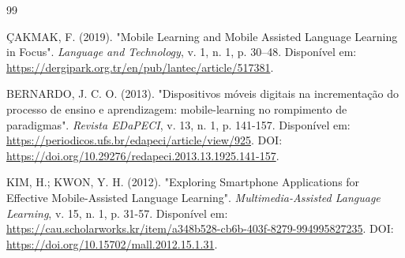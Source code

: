 \documentclass[portuguese]{sbcreviews-2025}%
\begin{document}
\begin{thebibliography}{99}

 ÇAKMAK, F. (2019). "Mobile Learning and Mobile Assisted Language Learning in Focus". \textit{Language and Technology}, v. 1, n. 1, p. 30–48. Disponível em: \url{https://dergipark.org.tr/en/pub/lantec/article/517381}.

 BERNARDO, J. C. O. (2013). "Dispositivos móveis digitais na incrementação do processo de ensino e aprendizagem: mobile-learning no rompimento de paradigmas". \textit{Revista EDaPECI}, v. 13, n. 1, p. 141-157. Disponível em: \url{https://periodicos.ufs.br/edapeci/article/view/925}. DOI: \url{https://doi.org/10.29276/redapeci.2013.13.1925.141-157}.

 KIM, H.; KWON, Y. H. (2012). "Exploring Smartphone Applications for Effective Mobile-Assisted Language Learning". \textit{Multimedia-Assisted Language Learning}, v. 15, n. 1, p. 31-57. Disponível em: \url{https://cau.scholarworks.kr/item/a348b528-cb6b-403f-8279-994995827235}. DOI: \url{https://doi.org/10.15702/mall.2012.15.1.31}.

\end{thebibliography}
\end{document}
